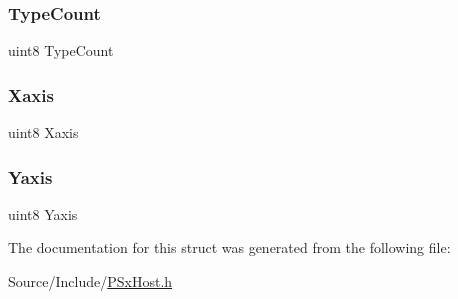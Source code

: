 \mbox{\label{structmousedata_af8950e4872b4b4b5dd2b837ac45a0603}} 
\subsubsection{\texorpdfstring{Type\+Count}{TypeCount}}
{\footnotesize\ttfamily uint8 Type\+Count}

\mbox{\label{structmousedata_aff6318c800e37a88edd40b023338c7b1}} 
\subsubsection{\texorpdfstring{Xaxis}{Xaxis}}
{\footnotesize\ttfamily uint8 Xaxis}

\mbox{\label{structmousedata_aba64dcb47ad58c7e914fc0a6093bc229}} 
\subsubsection{\texorpdfstring{Yaxis}{Yaxis}}
{\footnotesize\ttfamily uint8 Yaxis}



The documentation for this struct was generated from the following file\+:\begin{DoxyCompactItemize}
\item 
Source/\+Include/\mbox{\hyperlink{_p_sx_host_8h}{P\+Sx\+Host.\+h}}\end{DoxyCompactItemize}
